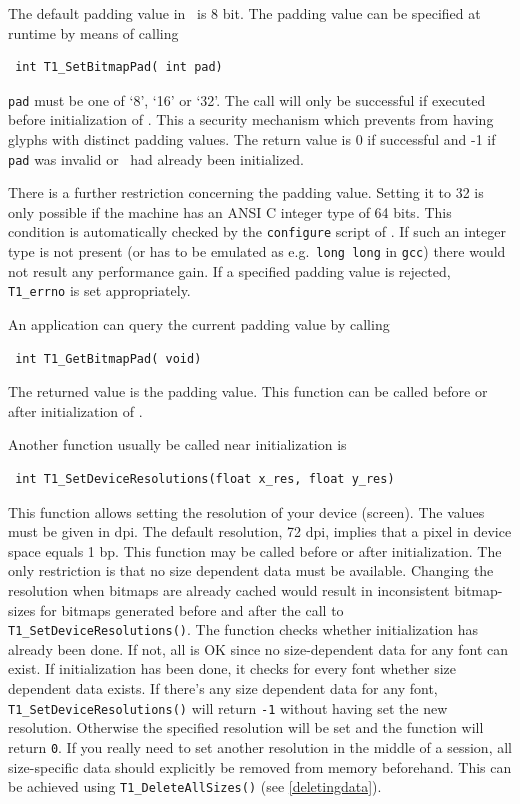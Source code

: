 The default padding value in \tonelib\ is 8 bit. The padding value can be
specified at runtime by means of calling  
\precorr
\begin{verbatim}
 int T1_SetBitmapPad( int pad)
\end{verbatim}\postcorr
\verb+pad+ must be one of `8', `16' or `32'. The call will only be successful
if executed before initialization of \tonelib. This a security mechanism which
prevents from having glyphs with distinct padding values. The return value is
0 if successful and -1 if \verb+pad+ was invalid or \tonelib\ had already been
initialized.

There is a further restriction concerning the padding value. Setting it to 32
is only possible if the machine has an ANSI C integer type of 64 bits. This
condition is automatically checked by the \verb+configure+ script of \tonelib.
If such an integer type is not present (or has to be emulated as e.g.\ 
\verb+long long+ in \verb+gcc+) there would not result any performance gain.
If a specified padding value is rejected, \verb+T1_errno+ is set
appropriately. 

An application can query the current padding value by calling 
\precorr
\begin{verbatim}
 int T1_GetBitmapPad( void)
\end{verbatim}\postcorr
The returned value is the padding value. This function can be called before or
after initialization of \tonelib.

Another function usually be called near
initialization is
\precorr
\begin{verbatim}
 int T1_SetDeviceResolutions(float x_res, float y_res) 
\end{verbatim}\postcorr
This function allows setting the resolution of
your device (screen). The values must be given in dpi. The default
resolution, 72 dpi, implies that a pixel in device space equals 1
bp. This function may be called before or after initialization. The
only restriction is that no size dependent data must be
available. Changing the resolution when bitmaps are already cached would 
result in inconsistent bitmap-sizes for bitmaps generated before and
after the call to \verb+T1_SetDeviceResolutions()+.
The function checks whether initialization has already been done. If
not, all is OK since no size-dependent data for any font can exist. If
initialization has been done, it checks for every font whether size
dependent data exists. If there's any size dependent data for any
font, \verb+T1_SetDeviceResolutions()+ will return \verb+-1+ without
having set the new resolution. Otherwise the specified resolution will
be set and the function will return \verb+0+.
If you really need to set
another resolution in the middle of a session, all size-specific data
should explicitly be removed from memory beforehand. This can be
achieved using \verb+T1_DeleteAllSizes()+ (see \ref{deletingdata}).

